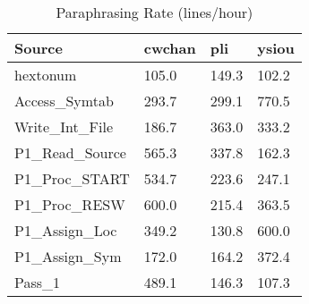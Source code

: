\begin{table}[hb]
\begin{center}
\begin{tabular}{|l|l|l|l|}
\hline
Source & cwchan & pli & ysiou\\
\hline
hextonum & 105.0 & 149.3 & 102.2\\
Access\_Symtab & 293.7 & 299.1 & 770.5\\
Write\_Int\_File & 186.7 & 363.0 & 333.2\\
P1\_Read\_Source & 565.3 & 337.8 & 162.3\\
P1\_Proc\_START & 534.7 & 223.6 & 247.1\\
P1\_Proc\_RESW & 600.0 & 215.4 & 363.5\\
P1\_Assign\_Loc & 349.2 & 130.8 & 600.0\\
P1\_Assign\_Sym & 172.0 & 164.2 & 372.4\\
Pass\_1 & 489.1 & 146.3 & 107.3\\
\hline
\end{tabular}
\end{center}
\caption{Paraphrasing Rate (lines/hour)}
\end{table}
